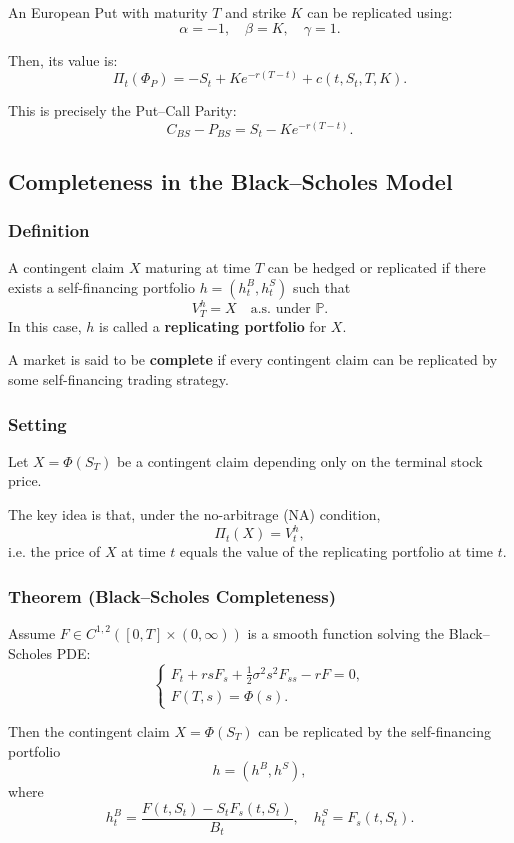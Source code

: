 \documentclass[12pt,a4paper]{article}
\theoremstyle{definition}
\newcommand{\Prob}{\mathbb{P}}
\begin{document}
An European Put with maturity $T$ and strike $K$ can be replicated using:
\[
\alpha = -1, \quad \beta = K, \quad \gamma = 1.
\]

Then, its value is:
\[
\Pi_t(\Phi_P) = -S_t + Ke^{-r(T-t)} + c(t, S_t, T, K).
\]

This is precisely the Put–Call Parity:
\[
C_{BS} - P_{BS} = S_t - Ke^{-r(T-t)}.
\]

\subsection{Completeness in the Black–Scholes Model}

\subsubsection{Definition}

A contingent claim $X$ maturing at time $T$ can be hedged or replicated if there exists a self-financing portfolio $h = (h_t^B, h_t^S)$ such that
\[
V_T^h = X \quad \text{a.s. under } \Prob.
\]
In this case, $h$ is called a \textbf{replicating portfolio} for $X$.

A market is said to be \textbf{complete} if every contingent claim can be replicated by some self-financing trading strategy.

\subsubsection{Setting}

Let $X = \Phi(S_T)$ be a contingent claim depending only on the terminal stock price.

The key idea is that, under the no-arbitrage (NA) condition,
\[
\Pi_t(X) = V_t^h,
\]
i.e. the price of $X$ at time $t$ equals the value of the replicating portfolio at time $t$.

\subsubsection{Theorem (Black–Scholes Completeness)}

Assume $F \in C^{1,2}([0,T] \times (0,\infty))$ is a smooth function solving the Black–Scholes PDE:
\[
\begin{cases}
F_t + rsF_s + \frac{1}{2}\sigma^2 s^2 F_{ss} - rF = 0, \\
F(T,s) = \Phi(s).
\end{cases}
\]

Then the contingent claim $X = \Phi(S_T)$ can be replicated by the self-financing portfolio
\[
h = (h^B, h^S),
\]
where
\[
h_t^B = \frac{F(t, S_t) - S_t F_s(t, S_t)}{B_t}, \quad h_t^S = F_s(t, S_t).
\]
\end{document}
